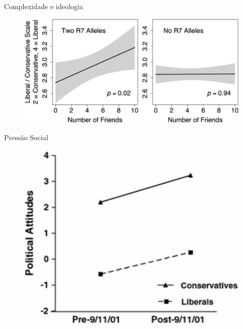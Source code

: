 \documentclass{beamer}
\begin{document}
    \begin{frame}{Complexidade e ideologia}%
        \begin{figure}
            \centering
            \includegraphics[scale=0.4]{Figures/DRD4_Fowler}
        \end{figure}
    \end{frame}%

    \begin{frame}{Pressão Social}%
        \begin{figure}
            \centering
            \includegraphics[scale=0.5]{Figures/nail_threat}
        \end{figure}
    \end{frame}%
\end{document}
